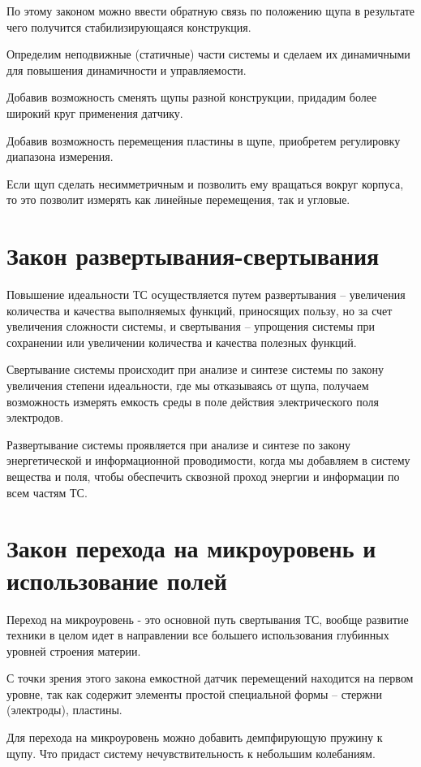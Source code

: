 По этому законом можно ввести обратную связь по положению щупа в результате чего получится стабилизирующаяся конструкция.

Определим неподвижные (статичные) части системы и сделаем их динамичными для повышения динамичности и управляемости.

Добавив возможность сменять щупы разной конструкции, придадим более широкий круг применения датчику.

Добавив возможность перемещения пластины в щупе, приобретем регулировку диапазона измерения.

Если щуп сделать несимметричным и позволить ему вращаться вокруг корпуса, то это позволит измерять как линейные перемещения, так и угловые.
 
\section{Закон развертывания-свертывания}

Повышение идеальности ТС осуществляется путем развертывания --  увеличения количества и качества выполняемых функций, приносящих пользу, но за счет увеличения сложности системы, и свертывания -- упрощения системы при сохранении или увеличении количества и качества полезных функций. 

Свертывание системы происходит при анализе и синтезе системы по закону увеличения степени идеальности, где мы отказываясь от щупа, получаем возможность измерять емкость среды в поле действия электрического поля электродов.

Развертывание системы проявляется при анализе и синтезе по закону энергетической и информационной проводимости, когда мы добавляем в систему вещества и поля, чтобы обеспечить сквозной проход энергии и информации по всем частям ТС.

\section{Закон перехода на микроуровень и использование полей}

Переход на микроуровень - это основной путь свертывания ТС,
вообще развитие техники в целом идет в направлении все большего
использования глубинных уровней строения материи.

С точки зрения этого закона емкостной датчик перемещений находится на первом уровне, так как содержит элементы простой специальной формы -- стержни (электроды), пластины.

Для перехода на микроуровень можно добавить демпфирующую пружину к щупу. Что придаст систему нечувствительность к небольшим колебаниям.

